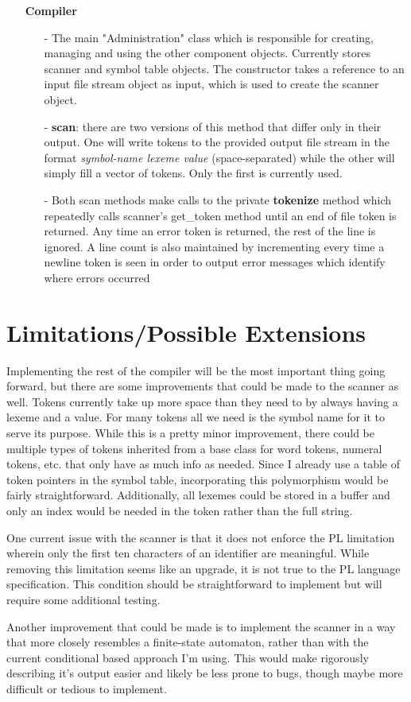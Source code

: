 \documentclass{article}
\begin{document}
\begin{itemize}
        \item[]\textbf{Compiler}
            \begin{itemize}
                \item[-] The main "Administration" class which is responsible for creating, managing and using the other component objects. Currently stores scanner and symbol table objects. The constructor takes a reference to an input file stream object as input, which is used to create the scanner object. 
                \item[-] \textbf{scan}: there are two versions of this method that differ only in their output. One will write tokens to the provided output file stream in the format \textit{symbol-name lexeme value} (space-separated) while the other will simply fill a vector of tokens. Only the first is currently used.  
                \item[-] Both scan methods make calls to the private \textbf{tokenize} method which repeatedly calls scanner's get\_token method until an end of file token is returned. Any time an error token is returned, the rest of the line is ignored. A line count is also maintained by incrementing every time a newline token is seen in order to output error messages which identify where errors occurred
            \end{itemize}

    \end{itemize}

    \section{Limitations/Possible Extensions}

        Implementing the rest of the compiler will be the most important thing going forward, but there are some improvements that could be made to the scanner as well. Tokens currently take up more space than they need to by always having a lexeme and a value. For many tokens all we need is the symbol name for it to serve its purpose. While this is a pretty minor improvement, there could be multiple types of tokens inherited from a base class for word tokens, numeral tokens, etc. that only have as much info as needed. Since I already use a table of token pointers in the symbol table, incorporating this polymorphism would be fairly straightforward. Additionally, all lexemes could be stored in a buffer and only an index would be needed in the token rather than the full string.

        One current issue with the scanner is that it does not enforce the PL limitation wherein only the first ten characters of an identifier are meaningful. While removing this limitation seems like an upgrade, it is not true to the PL language specification. This condition should be straightforward to implement but will require some additional testing.

        Another improvement that could be made is to implement the scanner in a way that more closely resembles a finite-state automaton, rather than with the current conditional based approach I'm using. This would make rigorously describing it's output easier and likely be less prone to bugs, though maybe more difficult or tedious to implement.
\end{document}
